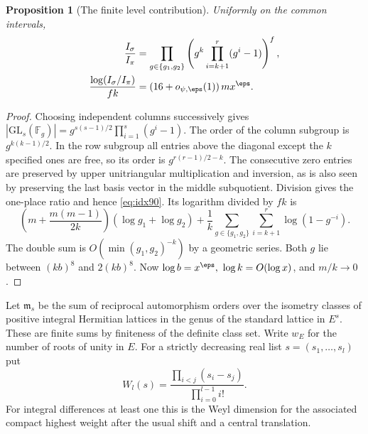 \documentclass[a4paper,11pt]{article}
\newtheorem{proposition}{Proposition}[section]
\theoremstyle{definition}
\theoremstyle{remark}
\numberwithin{equation}{section}
\begin{document}
\begin{proposition}[The finite level contribution]
\label{prop:index90}
Uniformly on the common intervals,
\begin{align}
 \frac{I_\sigma}{I_\pi}
 &=\prod_{g\in\{g_1,g_2\}}
            \left(g^k\prod_{i=k+1}^{r}(g^i-1)\right)^f,
                                                     \label{eq:idx90}\\
 \frac{\log(I_\sigma/I_\pi)}{fk}
 &=(16+o_{\psi,\eps}(1))\,m x^\eps .                 \notag
\end{align}
\end{proposition}
\begin{proof}
Choosing independent columns successively gives
\(|\mathrm{GL}_s(\mathbb F_g)|=
g^{s(s-1)/2}\prod_{i=1}^s(g^i-1)\). The order of the
column subgroup is \(g^{k(k-1)/2}\). In the row subgroup
all entries above the diagonal except the \(k\) specified ones
are free, so its order is \(g^{r(r-1)/2-k}\).
The consecutive zero entries are preserved by upper unitriangular
multiplication and inversion, as is also seen by preserving
the last basis vector in the middle subquotient. Division gives
the one-place ratio and hence \eqref{eq:idx90}. Its logarithm
divided by \(fk\) is
\[
 \left(m+\frac{m(m-1)}{2k}\right)(\log g_1+\log g_2)
       +\frac1k\sum_{g\in\{g_1,g_2\}}\sum_{i=k+1}^{r}\log(1-g^{-i}).
\]
The double sum is \(O(\min(g_1,g_2)^{-k})\) by a geometric
series. Both \(g\) lie between \((kb)^8\) and \(2(kb)^8\).
Now \(\log b=x^\eps,\ \log k=O(\log x)\), and \(m/k\to0\).
\end{proof}

Let \(\mathfrak m_s\) be the sum of reciprocal automorphism
orders over the isometry classes of positive integral Hermitian
lattices in the genus of the standard lattice in \(E^s\).
These are finite sums by finiteness of the definite class set.
Write \(w_E\) for the number of roots of unity in \(E\). For a
strictly decreasing real list \(s=(s_1,\ldots,s_l)\) put
\[
  W_l(s)=\frac{\prod_{i<j}(s_i-s_j)}
                    {\prod_{i=0}^{l-1}i!}.
\]
For integral differences at least one this is the Weyl
dimension for the associated compact highest weight after the
usual shift and a central translation.
\end{document}
